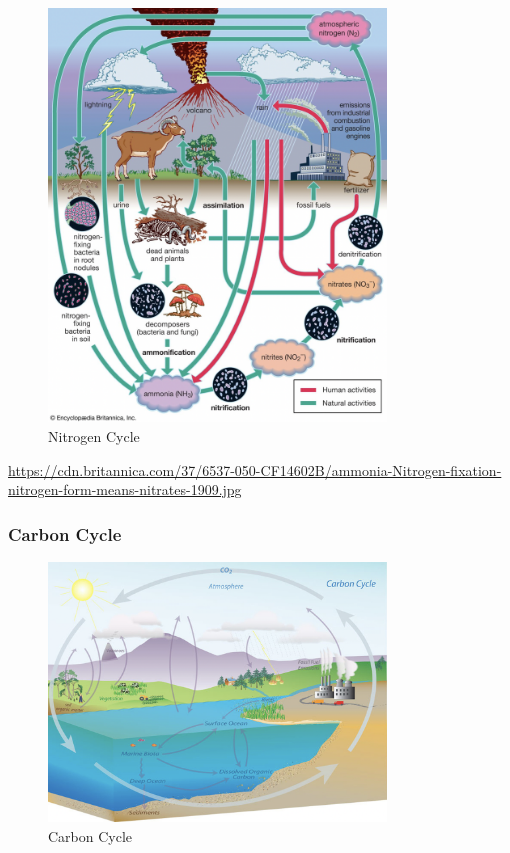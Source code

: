 \documentclass[
]{book}
\begin{document}
\begin{figure}
\centering
\includegraphics[width=0.8\textwidth,height=\textheight]{./Figures/Nitrogen.png}
\caption{Nitrogen Cycle}
\end{figure}

\url{https://cdn.britannica.com/37/6537-050-CF14602B/ammonia-Nitrogen-fixation-nitrogen-form-means-nitrates-1909.jpg}

\hypertarget{carbon-cycle}{%
\subsubsection{Carbon Cycle}\label{carbon-cycle}}

\begin{figure}
\centering
\includegraphics[width=0.8\textwidth,height=\textheight]{./Figures/Carbon2.png}
\caption{Carbon Cycle}
\end{figure}
\end{document}
